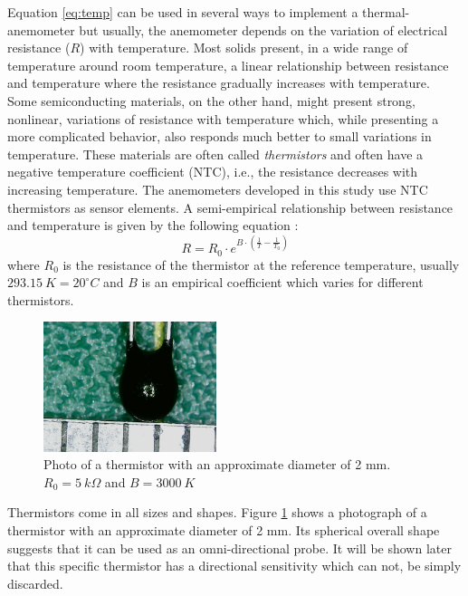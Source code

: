 \documentclass[10pt,fleqn,a4paper,twoside]{article}
\begin{document}
Equation \ref{eq:temp} can be used in several ways to implement a thermal-anemometer but usually, the anemometer depends on the variation of electrical resistance ($R$) with temperature. Most solids present, in a wide range of temperature around room temperature, a linear relationship between resistance and temperature where the resistance gradually increases with temperature. Some semiconducting materials, on the other hand, might present strong, nonlinear, variations of resistance with temperature which, while presenting a more complicated behavior, also responds much better to small variations in temperature. These materials are often called \emph{thermistors} and often have a negative temperature coefficient (NTC), i.e., the resistance decreases with increasing temperature. The anemometers developed in this study use NTC thermistors as sensor elements. A semi-empirical relationship between resistance and temperature is given by the following equation \citep{Sandborn72}:
\begin{equation}
  R = R_0 \cdot e^{B\cdot\left(\frac{1}{T} - \frac{1}{T_0} \right)}
  \label{eq:thermistor}
\end{equation}
where $R_0$ is the resistance of the thermistor at the reference temperature, usually $293.15\:K = 20^\circ C$ and $B$ is an empirical coefficient which varies for different thermistors.

\begin{figure}[h!]
\centering
\includegraphics[width=0.45\textwidth]{../../figures/termistor.jpg}
\caption{Photo of a thermistor with an approximate diameter of 2 mm. $R_0 = 5\:k\Omega$ and $B = 3000\:K$}
\label{fig:thermistor}
\end{figure}

Thermistors come in all sizes and shapes. Figure \ref{fig:thermistor} shows a photograph of a thermistor with an approximate diameter of 2 mm. Its spherical overall shape suggests that it can be used as an omni-directional probe. It will be shown later that this specific thermistor has a directional sensitivity which can not, be simply discarded.
\end{document}
